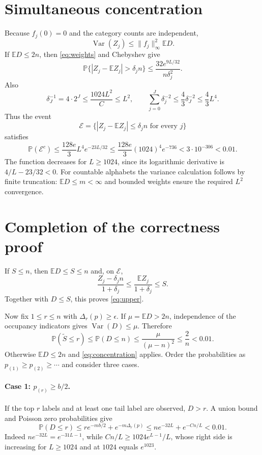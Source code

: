 \documentclass[11pt]{article}
\newcommand{\E}{\mathbb E}
\newcommand{\Prb}{\mathbb P}
\newcommand{\Var}{\operatorname{Var}}
\begin{document}
\section{Simultaneous concentration}
Because $f_j(0)=0$ and the category counts are independent,
\[
 \Var(Z_j)\le\|f_j\|_\infty^2\E D.
\]
If $\E D\le2n$, then \eqref{eq:weights} and Chebyshev give
\[
 \Prb\{|Z_j-\E Z_j|>\delta_jn\}
 \le\frac{32e^{9L/32}}{n\delta_j^2}.
\]
Also
\[
 \delta_J^{-1}=4\cdot2^J\le\frac{1024L^2}{C}\le L^2,
 \qquad \sum_{j=0}^J\delta_j^{-2}\le\frac43\delta_J^{-2}\le\frac43L^4.
\]
Thus the event
\[
 \mathcal E=\{|Z_j-\E Z_j|\le\delta_jn\text{ for every }j\}
\]
satisfies
\begin{equation}
 \Prb(\mathcal E^c)
 \le\frac{128e}{3}L^4e^{-23L/32}
 \le\frac{128e}{3}(1024)^4e^{-736}
 <3\cdot10^{-306}<0.01.\label{eq:concentration}
\end{equation}
The function decreases for $L\ge1024$, since its logarithmic derivative
is $4/L-23/32<0$. For countable alphabets the variance calculation follows
by finite truncation: $\E D\le m<\infty$ and bounded weights ensure the
required $L^2$ convergence.

\section{Completion of the correctness proof}
If $S\le n$, then $\E D\le S\le n$ and, on $\mathcal E$,
\[
 \frac{Z_j-\delta_jn}{1+\delta_j}
 \le\frac{\E Z_j}{1+\delta_j}\le S.
\]
Together with $D\le S$, this proves \eqref{eq:upper}.

Now fix $1\le r\le n$ with $\Delta_r(p)\ge\epsilon$.
If $\mu=\E D>2n$, independence of the occupancy indicators gives
$\Var(D)\le\mu$. Therefore
\[
 \Prb(\widetilde S\le r)\le\Prb(D\le n)
 \le\frac{\mu}{(\mu-n)^2}\le\frac2n<0.01.
\]
Otherwise $\E D\le2n$ and \eqref{eq:concentration} applies. Order the
probabilities as $p_{(1)}\ge p_{(2)}\ge\cdots$ and consider three cases.

\paragraph{Case 1: $p_{(r)}\ge b/2$.}
If the top $r$ labels and at least one tail label are observed, $D>r$.
A union bound and Poisson zero probabilities give
\[
 \Prb(D\le r)\le r e^{-mb/2}+e^{-m\Delta_r(p)}
 \le ne^{-32L}+e^{-Cn/L}<0.01.
\]
Indeed $ne^{-32L}=e^{-31L-1}$, while $Cn/L\ge1024e^{L-1}/L$,
whose right side is increasing for $L\ge1024$ and at $1024$ equals $e^{1023}$.
\end{document}
